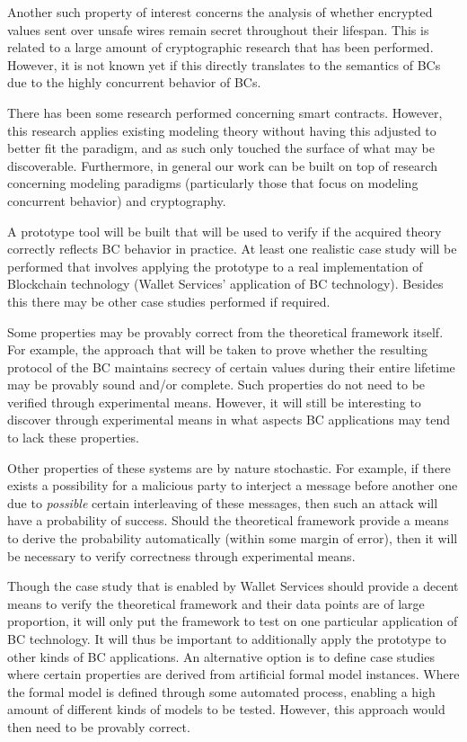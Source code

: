\documentclass[]{article}
\begin{document}
Another such property of interest concerns the analysis of whether encrypted values sent over unsafe wires remain secret throughout their lifespan. This is related to a large amount of cryptographic research that has been performed. However, it is not known yet if this directly translates to the semantics of BCs due to the highly concurrent behavior of BCs.

There has been some research performed concerning smart contracts. However, this research applies existing modeling theory without having this adjusted to better fit the paradigm, and as such only touched the surface of what may be discoverable. Furthermore, in general our work can be built on top of research concerning modeling paradigms (particularly those that focus on modeling concurrent behavior) and cryptography.

A prototype tool will be built that will be used to verify if the acquired theory correctly reflects BC behavior in practice. At least one realistic case study will be performed that involves applying the prototype to a real implementation of Blockchain technology (Wallet Services' application of BC technology). Besides this there may be other case studies performed if required.

Some properties may be provably correct from the theoretical framework itself. For example, the approach that will be taken to prove whether the resulting protocol of the BC maintains secrecy of certain values during their entire lifetime may be provably sound and/or complete. Such properties do not need to be verified through experimental means. However, it will still be interesting to discover through experimental means in what aspects BC applications may tend to lack these properties.

Other properties of these systems are by nature stochastic. For example, if there exists a possibility for a malicious party to interject a message before another one due to \emph{possible} certain interleaving of these messages, then such an attack will have a probability of success. Should the theoretical framework provide a means to derive the probability automatically (within some margin of error), then it will be necessary to verify correctness through experimental means.

Though the case study that is enabled by Wallet Services should provide a decent means to verify the theoretical framework and their data points are of large proportion, it will only put the framework to test on one particular application of BC technology. It will thus be important to additionally apply the prototype to other kinds of BC applications. An alternative option is to define case studies where certain properties are derived from artificial formal model instances. Where the formal model is defined through some automated process, enabling a high amount of different kinds of models to be tested. However, this approach would then need to be provably correct.
\end{document}
